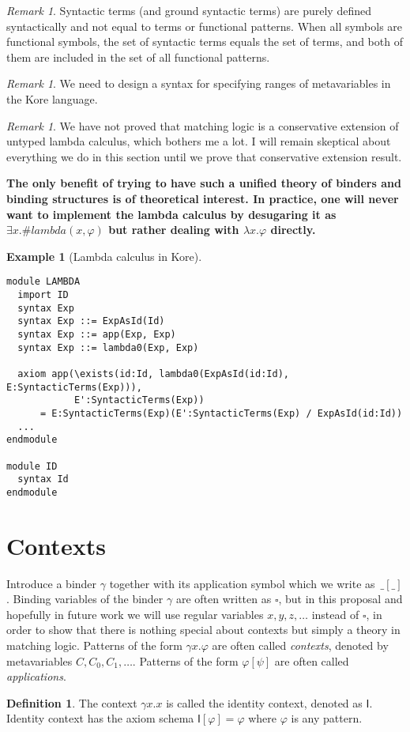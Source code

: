 \documentclass{article}
\newcommand{\comment}[1]
    {\par {\bfseries \color{blue} #1 \par}} %
\newcounter{thmcounter}
\theoremstyle{plain}
\theoremstyle{definition}
\newtheorem{definition}[thmcounter]{Definition}
\newtheorem{example}[thmcounter]{Example}
\theoremstyle{remark}
\newtheorem{remark}[thmcounter]{Remark}
\newcommand{\I}{\mathsf{I}}
\begin{document}
\begin{remark}
Syntactic terms (and ground syntactic terms) are purely defined syntactically and not equal to terms or functional patterns. When all symbols are functional symbols, the set of syntactic terms equals the set of terms, and both of them are included in the set of all functional patterns. 
\end{remark}

\begin{remark}
We need to design a syntax for specifying ranges of metavariables in the Kore language. 
\end{remark}

\begin{remark}
We have not proved that matching logic is a conservative extension of untyped lambda calculus, which bothers me a lot. I will remain skeptical about everything we do in this section until we prove that conservative extension result. 
\end{remark}

\comment{The only benefit of trying to have such a unified theory of binders and binding structures is of theoretical interest. In practice, one will never want to implement the lambda calculus by desugaring it as $\exists x . \#lambda(x, \varphi)$ but rather dealing with $\lambda x . \varphi$ directly. }

\begin{example}[Lambda calculus in Kore]
\quad
\begin{Verbatim}[fontsize=\small]
module LAMBDA
  import ID
  syntax Exp
  syntax Exp ::= ExpAsId(Id)
  syntax Exp ::= app(Exp, Exp)
  syntax Exp ::= lambda0(Exp, Exp)
  
  axiom app(\exists(id:Id, lambda0(ExpAsId(id:Id), E:SyntacticTerms(Exp))), 
            E':SyntacticTerms(Exp))
      = E:SyntacticTerms(Exp)(E':SyntacticTerms(Exp) / ExpAsId(id:Id))
  ...
endmodule

module ID
  syntax Id 
endmodule
\end{Verbatim}
\end{example}


\section{Contexts}

Introduce a binder $\gamma$ together with its application symbol which we write as~$\_[\_]$. Binding variables of the binder $\gamma$ are often written as $\square$, but in this proposal and hopefully in future work we will use regular variables $x, y, z, \dots$ instead of $\square$, in order to show that there is nothing special about contexts but simply a theory in matching logic. Patterns of the form $\gamma x . \varphi$ are often called \emph{contexts}, denoted by metavariables $C, C_0, C_1, \dots$. Patterns of the form $\varphi[\psi]$ are often called \emph{applications}. 
\begin{definition}
	The context $\gamma x . x$ is called the identity context, denoted as $\I$. Identity context has the axiom schema $\I[\varphi]=\varphi$ where $\varphi$ is any pattern.
\end{definition}
\end{document}
